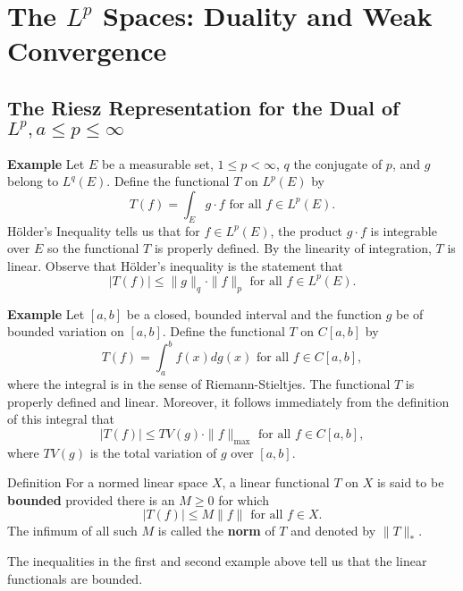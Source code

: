 \chapter{The $L^p$ Spaces: Duality and Weak Convergence}

\section{The Riesz Representation for the Dual of $L^p,a\le p\le \infty$}

\textbf{Example}
Let $E$ be a measurable set, $1\le p<\infty$, $q$ the conjugate of $p$, and $g$ belong to $L^q(E)$.
Define the functional $T$ on $L^p(E)$ by
\[
    T(f)=\int_Eg\cdot f\text{ for all }f\in L^p(E).
\]
H\"older's Inequality tells us that for $f\in L^p(E)$, the product $g\cdot f$ is integrable over $E$ so the functional $T$ is properly defined.
By the linearity of integration, $T$ is linear.
Observe that H\"older's inequality is the statement that 
\[
    |T(f)|\le\|g\|_q\cdot\|f\|_p\text{ for all }f\in L^p(E).
\]
\begin{flushleft}

\textbf{Example}
Let $[a,b]$ be a closed, bounded interval and the function $g$ be of bounded variation on $[a,b]$.
Define the functional $T$ on $C[a,b]$ by
\[
    T(f)=\int_a^bf(x)dg(x)\text{ for all }f\in C[a,b],
\]  
where the integral is in the sense of Riemann-Stieltjes.
The functional $T$ is properly defined and linear.
Moreover, it follows immediately from the definition of this integral that 
\[
    |T(f)|\le TV(g)\cdot\|f\|_{\max}\text{ for all }f\in C[a,b],
\]  
where $TV(g)$ is the total variation of $g$ over $[a,b]$.
\end{flushleft}
\begin{namedthm*}{Definition}
    For a normed linear space $X$, a linear functional $T$ on $X$ is said to be \textbf{bounded} provided there is an $M\ge0$ for which 
\[
    |T(f)|\le M\|f\|\text{ for all }f\in X.
\]
The infimum of all such $M$ is called the \textbf{norm} of $T$ and denoted by $\|T\|_*$.
\end{namedthm*}
The inequalities in the first and second example above tell us that the linear functionals are bounded.

